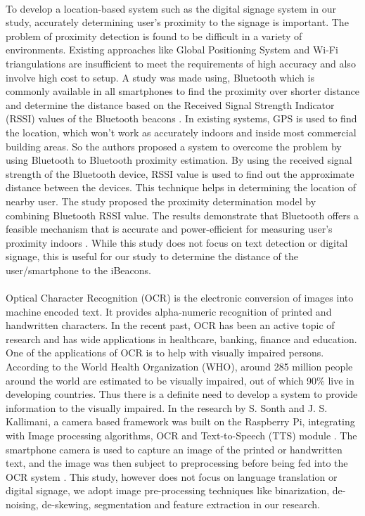 \documentclass[12pt]{article}
\begin{document}
\paragraph{} To develop a location-based system such as the digital signage system in our study, accurately determining user's proximity to the signage is important. The problem of proximity detection is found to be difficult in a variety of environments. Existing approaches like Global Positioning System and Wi-Fi triangulations are insufficient to meet the requirements of high accuracy and also involve high cost to setup. A study was made using, Bluetooth which is commonly available in all smartphones to find the proximity over shorter distance and determine the distance based on the Received Signal Strength Indicator (RSSI) values of the Bluetooth  beacons \cite{distance}. In existing systems, GPS is used to find the location, which won't work as accurately indoors and inside most commercial building areas. So the authors proposed a system to overcome the problem by using Bluetooth to Bluetooth proximity estimation. By using the received signal strength of the Bluetooth device, RSSI value is used to find out the approximate distance between the devices. This technique helps in determining the location of nearby user. The study proposed the proximity determination model by combining Bluetooth RSSI value. The results demonstrate that Bluetooth offers a feasible mechanism that is accurate and power-efficient for measuring user's proximity indoors \cite{distance}. While this study does not focus on text detection or digital signage, this is  useful for our study to determine the distance of the user/smartphone to the iBeacons.

\paragraph{}Optical Character Recognition (OCR) is the electronic conversion of images into machine encoded text. It provides alpha-numeric recognition of printed and handwritten characters. In the recent past, OCR has been an active topic of research and has wide applications in healthcare, banking, finance and education. One of the applications of OCR is to help with visually impaired persons. According to the World Health Organization (WHO), around 285 million people around the world are estimated to be visually impaired, out of which 90\% live in developing countries. Thus there is a definite need to develop a system to provide information to the visually impaired. In the research by S. Sonth and J. S. Kallimani, a camera based framework was built on the Raspberry Pi, integrating with Image processing algorithms, OCR and Text-to-Speech (TTS) module \cite{ocr}. The smartphone camera is used to capture an image of the printed or handwritten text, and the image was then subject to preprocessing before being fed into the OCR system \cite{ocr}. This study, however does not focus on language translation or digital signage, we adopt image pre-processing techniques like binarization, de-noising, de-skewing, segmentation and feature extraction in our research.
\end{document}
